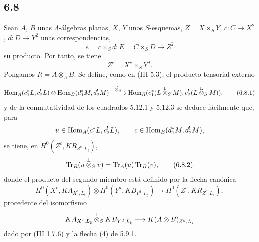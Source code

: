 \subsection*{6.8}
Sean $A$, $B$ unas $\Lambda$-álgebras planas, $X$, $Y$ unos $S$-esquemas, $Z=X\times_SY$, $c:C\to X^2$, $d:D\to Y^2$ unas correspondencias,
\[
e=c\times_Sd:E=C\times_SD\longrightarrow Z^2
\]
su producto. Por tanto, se tiene
\[
Z^e=X^c\times_SY^d.
\]
Pongamos $R=A\otimes_{\Lambda}B$. Se define, como en (III 5.3), el producto tensorial externo
\begin{equation}
\operatorname{Hom}_A(c_1^*L,c_2^!L)\otimes \operatorname{Hom}_B(d_1^*M,d_2^!M)
\xrightarrow{\ \overset{\mathrm L}{\otimes}_S\ }
\operatorname{Hom}_R(e_1^*(L\overset{\mathrm L}{\otimes}_SM),e_2^!(L\overset{\mathrm L}{\otimes}_SM)),
\tag{6.8.1}
\end{equation}
y de la conmutatividad de los cuadrados 5.12.1 y 5.12.3 se deduce fácilmente que, para
\[
u\in\operatorname{Hom}_A(c_1^*L,c_2^!L),\qquad c\in\operatorname{Hom}_B(d_1^*M,d_2^!M),
\]
se tiene, en $H^0(Z^c,KR_{Z^c,L_{\natural}})$,
\begin{equation}
\operatorname{Tr}_R(u\overset{\mathrm L}{\otimes}_Sv)=\operatorname{Tr}_A(u)\operatorname{Tr}_B(v),
\tag{6.8.2}
\end{equation}
donde el producto del segundo miembro está definido por la flecha canónica
\begin{equation}
H^0(X^c,KA_{X^c,L_{\natural}})\otimes
H^0(Y^d,KB_{Y^d,L_{\natural}})
\longrightarrow
H^0(Z^c,KR_{Z^c,L_{\natural}}),
\tag{6.8.3}
\end{equation}
procedente del isomorfismo
\[
KA_{X^c,L_{\natural}}\overset{\mathrm L}{\otimes}_S KB_{Y^d,L_{\natural}}\longrightarrow K(A\otimes B)_{Z^d,L_{\natural}}
\]
dado por (III 1.7.6) y la flecha (4) de 5.9.1.
